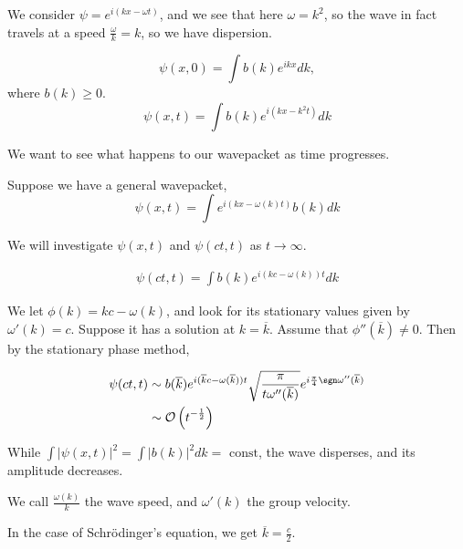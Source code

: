 \documentclass[a4paper]{article}
\begin{document}
We consider $\psi = e^{i(kx - \omega t)}$, and we see that here $\omega = k^2$, so the wave in fact travels at a speed $\frac{\omega}{k} = k$, so we have dispersion.

 \[
	 \psi(x,0) =  \int b(k) e^{ikx} dk
 ,\] where $b(k) \ge 0$. 
 \[
	 \psi(x,t) = \int b(k) e^{i(kx - k^2t)} dk
 \] 

We want to see what happens to our wavepacket as time progresses.

\vspace{1em}
Suppose we have a general wavepacket,
\[
	\psi(x,t) = \int e^{i(kx - \omega(k)t)} b(k) dk
\] 

We will investigate $\psi(x,t)$ and $\psi(ct, t)$ as $t\to \infty$.

\begin{align*}
	\psi(ct, t) = \int b(k) e^{i(kc - \omega(k))t} dk
\end{align*}

We let $\phi(k) = kc - \omega(k)$, and look for its stationary values given by  $\omega'(k) = c$. Suppose it has a solution at  $k = \overline{k}$. Assume that $\phi''(\overline{k}) \neq 0$. Then by the stationary phase method,

\begin{align*}
	\psi(ct, t) &\sim b(\overline{k}) e^{i(\overline{k}c  -\omega(\overline{k}))t} \sqrt{\frac{\pi}{t\omega''(\overline{k})}} e^{i\frac{\pi}{4} \sgn \omega''(\overline{k})} \\
	&\sim  \mathcal{O} \left( t^{-\frac{1}{2}} \right) 
\end{align*}

While $\int |\psi(x,t)|^2 = \int |b(k)|^2 dk = \text{ const}$, the wave disperses, and its amplitude decreases.

We call $\frac{\omega(k)}{k}$ the wave speed, and $\omega'(k)$ the group velocity.

In the case of Schr\"{o}dinger's equation, we get $\overline{k} = \frac{c}{2}$.
\end{document}

